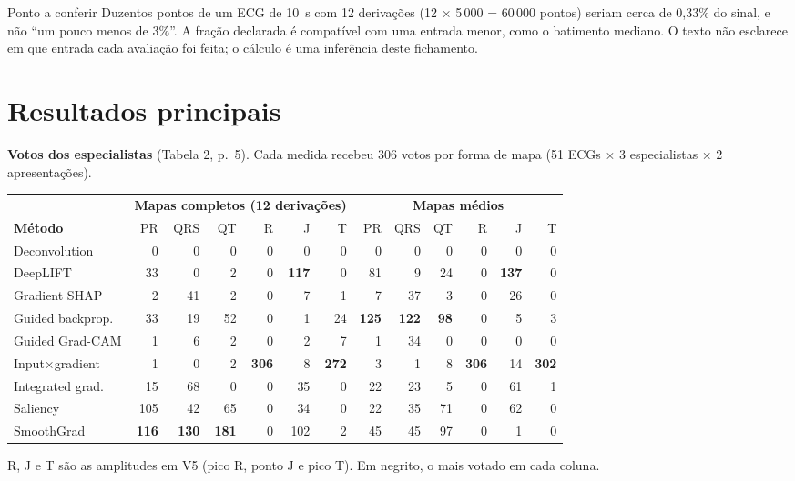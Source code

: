 \documentclass[11pt,a4paper]{article}
\begin{document}
\begin{infobox}[warn]{Ponto a conferir}
Duzentos pontos de um ECG de 10~s com 12 derivações (12 × 5\,000 = 60\,000 pontos) seriam cerca de 0,33\% do sinal, e não “um pouco menos de 3\%”. A fração declarada é compatível com uma entrada menor, como o batimento mediano. O texto não esclarece em que entrada cada avaliação foi feita; o cálculo é uma inferência deste fichamento.
\end{infobox}

\section{Resultados principais}
\textbf{Votos dos especialistas} (Tabela 2, p.~5). Cada medida recebeu 306 votos por forma de mapa (51 ECGs × 3 especialistas × 2 apresentações).
\begin{center}\small
\setlength{\tabcolsep}{4pt}
\begin{tabular}{lrrrrrr|rrrrrr}
\toprule
& \multicolumn{6}{c|}{\textbf{Mapas completos (12 derivações)}} & \multicolumn{6}{c}{\textbf{Mapas médios}} \\
\textbf{Método} & PR & QRS & QT & R & J & T & PR & QRS & QT & R & J & T \\
\midrule
Deconvolution & 0 & 0 & 0 & 0 & 0 & 0 & 0 & 0 & 0 & 0 & 0 & 0 \\
DeepLIFT & 33 & 0 & 2 & 0 & \textbf{117} & 0 & 81 & 9 & 24 & 0 & \textbf{137} & 0 \\
Gradient SHAP & 2 & 41 & 2 & 0 & 7 & 1 & 7 & 37 & 3 & 0 & 26 & 0 \\
Guided backprop. & 33 & 19 & 52 & 0 & 1 & 24 & \textbf{125} & \textbf{122} & \textbf{98} & 0 & 5 & 3 \\
Guided Grad-CAM & 1 & 6 & 2 & 0 & 2 & 7 & 1 & 34 & 0 & 0 & 0 & 0 \\
Input×gradient & 1 & 0 & 2 & \textbf{306} & 8 & \textbf{272} & 3 & 1 & 8 & \textbf{306} & 14 & \textbf{302} \\
Integrated grad. & 15 & 68 & 0 & 0 & 35 & 0 & 22 & 23 & 5 & 0 & 61 & 1 \\
Saliency & 105 & 42 & 65 & 0 & 34 & 0 & 22 & 35 & 71 & 0 & 62 & 0 \\
SmoothGrad & \textbf{116} & \textbf{130} & \textbf{181} & 0 & 102 & 2 & 45 & 45 & 97 & 0 & 1 & 0 \\
\bottomrule
\end{tabular}
\end{center}
R, J e T são as amplitudes em V5 (pico R, ponto J e pico T). Em negrito, o mais votado em cada coluna.
\end{document}
